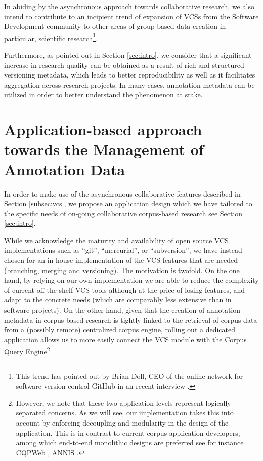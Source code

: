 \documentclass{sig-alternate}
\begin{document}
In abiding by the asynchronous approach towards collaborative research, we also intend to
contribute to an incipient trend of expansion of VCSs from the Software Development community
to other areas of group-based data creation \textemdash in particular, scientific research\footnote{
  This trend has pointed out by Brian Doll, CEO of the online network for software version
  control GitHub in an recent interview \cite{Begel2013}.
}.

Furthermore, as pointed out in Section \ref{sec:intro}, we consider that a significant increase in
research quality can be obtained as a result of rich and structured versioning metadata,
which leads to better reproducibility as well as it facilitates aggregation across research
projects. In many cases, annotation metadata can be utilized in order to better understand the
phenomenon at stake.

\section{Application-based approach towards the Management of Annotation Data}\label{sec:case}

In order to make use of the asynchronous collaborative features described in Section
\ref{subsec:vcs}, we propose an application design which we have tailored to the specific needs
of on-going collaborative corpus-based research \textemdash see Section \ref{sec:intro}.

While we acknowledge the maturity and availability of open source VCS implementations such as
``git'', ``mercurial'', or ``subversion'', we have instead chosen for an in-house implementation
of the VCS features that are needed (branching, merging and versioning). The motivation is twofold.
On the one hand, by relying on our own implementation we are able to reduce the complexity of
current off-the-shelf VCS tools \textemdash although at the price of losing features,
and adapt to the concrete needs (which are comparably less extensive than in software projects).
On the other hand, given that the creation of annotation metadata in corpus-based research
is tightly linked to the retrieval of corpus data from a (possibly remote) centralized corpus engine,
rolling out a dedicated application allows us to more easily connect the VCS module with the Corpus
Query Engine\footnote{
  However, we note that these two application levels represent logically separated concerns.
  As we will see, our implementation takes this into account by enforcing decoupling and modularity
  in the design of the application. This is in contrast to current corpus application developers,
  among which end-to-end monolithic designs are preferred \textemdash see for instance
  CQPWeb \cite{Hardie2012}, ANNIS \cite{Zeldes2009}.
}.
\end{document}
